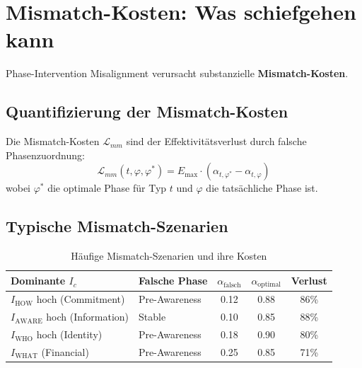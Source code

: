 \section{Mismatch-Kosten: Was schiefgehen kann}
\label{sec:18-mismatch}

Phase-Intervention Misalignment verursacht substanzielle \textbf{Mismatch-Kosten}.

\subsection{Quantifizierung der Mismatch-Kosten}

\begin{definition}
\label{def:18-mismatch}
Die Mismatch-Kosten $\mathcal{L}_{mm}$ sind der Effektivitätsverlust durch falsche Phasenzuordnung:
\begin{equation}
\mathcal{L}_{mm}(t, \varphi, \varphi^*) = E_{\max} \cdot (\alpha_{t,\varphi^*} - \alpha_{t,\varphi})
\label{eq:18-mismatch-cost}
\end{equation}
wobei $\varphi^*$ die optimale Phase für Typ $t$ und $\varphi$ die tatsächliche Phase ist.
\end{definition}

\subsection{Typische Mismatch-Szenarien}

\begin{table}[htbp]
\centering
\caption{Häufige Mismatch-Szenarien und ihre Kosten}
\label{tab:18-mismatch-scenarios}
\renewcommand{\arraystretch}{1.3}
\small
\begin{tabular}{@{}llccc@{}}
\toprule
\textbf{Dominante $I_c$} & \textbf{Falsche Phase} & \textbf{$\alpha_{\text{falsch}}$} & \textbf{$\alpha_{\text{optimal}}$} & \textbf{Verlust} \\
\midrule
$I_{\text{HOW}}$ hoch (Commitment) & Pre-Awareness & 0.12 & 0.88 & 86\% \\
$I_{\text{AWARE}}$ hoch (Information) & Stable & 0.10 & 0.85 & 88\% \\
$I_{\text{WHO}}$ hoch (Identity) & Pre-Awareness & 0.18 & 0.90 & 80\% \\
$I_{\text{WHAT}}$ (Financial) & Pre-Awareness & 0.25 & 0.85 & 71\% \\
\bottomrule
\end{tabular}
\end{table}

